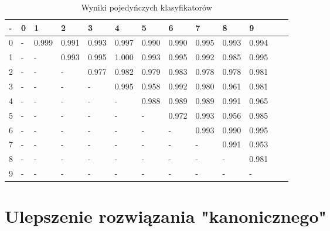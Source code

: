 \documentclass[a4paper]{article}
\begin{document}
\begin{table}[H]
    \caption{Wyniki pojedyńczych klasyfikatorów
    \label{table:indiv}
    }
\begin{center}
    \begin{tabular}{| l | l | l | l | l | l | l | l | l | l | l | l | l |}
    \hline
        - & 0 & 1 & 2 & 3 & 4 & 5 & 6 & 7 & 8 & 9 \\
    \hline
 0 &  -     & 0.999 & 0.991 & 0.993 & 0.997 & 0.990 & 0.990 & 0.995 & 0.993 & 0.994 \\
 1 &  -     & -     & 0.993 & 0.995 & 1.000 & 0.993 & 0.995 & 0.992 & 0.985 & 0.995 \\
 2 &  -     & -     & -     & 0.977 & 0.982 & 0.979 & 0.983 & 0.978 & 0.978 & 0.981 \\
 3 &  -     & -     & -     & -     & 0.995 & 0.958 & 0.992 & 0.980 & 0.961 & 0.981 \\
 4 &  -     & -     & -     & -     & -     & 0.988 & 0.989 & 0.989 & 0.991 & 0.965 \\
 5 &  -     & -     & -     & -     & -     & -     & 0.972 & 0.993 & 0.956 & 0.985 \\
 6 &  -     & -     & -     & -     & -     & -     & -     & 0.993 & 0.990 & 0.995 \\
 7 &  -     & -     & -     & -     & -     & -     & -     & -     & 0.991 & 0.953 \\
 8 &  -     & -     & -     & -     & -     & -     & -     & -     & -     & 0.981 \\
 9 &  -     & -     & -     & -     & -     & -     & -     & -     & -     & -     \\
    \hline
    \end{tabular}
\end{center}
\end{table}


\section{Ulepszenie rozwiązania "kanonicznego"}
\label{improved}
\end{document}
